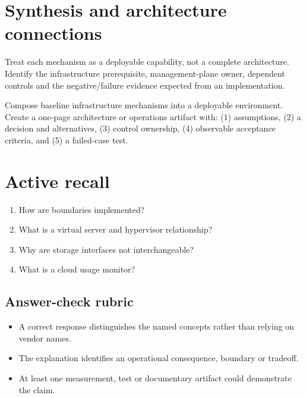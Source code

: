 \documentclass[10pt,letterpaper]{article}
\begin{document}
\section{Synthesis and architecture connections}
Treat each mechanism as a deployable capability, not a complete architecture. Identify the infrastructure prerequisite, management-plane owner, dependent controls and the negative/failure evidence expected from an implementation.
\begin{workbox}[title={Applied deliverable}]
Compose baseline infrastructure mechanisms into a deployable environment.\\[4pt]Create a one-page architecture or operations artifact with: (1) assumptions, (2) a decision and alternatives, (3) control ownership, (4) observable acceptance criteria, and (5) a failed-case test.
\end{workbox}
\section{Active recall}
\begin{enumerate}
\item How are boundaries implemented?
\item What is a virtual server and hypervisor relationship?
\item Why are storage interfaces not interchangeable?
\item What is a cloud usage monitor?
\end{enumerate}
\subsection{Answer-check rubric}
\begin{itemize}
\item A correct response distinguishes the named concepts rather than relying on vendor names.
\item The explanation identifies an operational consequence, boundary or tradeoff.
\item At least one measurement, test or documentary artifact could demonstrate the claim.
\end{itemize}
\end{document}

